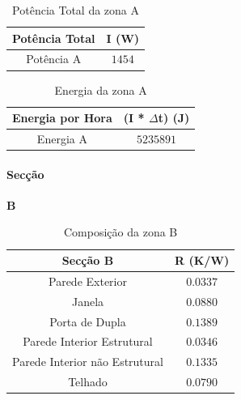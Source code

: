 \documentclass[12pt, a4paper]{article}
\begin{document}
\vspace{35mm}

\begin{table}[htpb]
	\begin{center}
		\begin{tabular}{c c}
			\toprule
			Potência  Total 										 & 	I (W) \\
			\midrule
			 Potência A		               	     & $1454$	 \\
			\bottomrule
		\end{tabular}
	\end{center}
	\caption{Potência Total da zona A}\label{tab:seccaoApotT}
\end{table}

\vspace{35mm}

\begin{table}[htpb]
	\begin{center}
		\begin{tabular}{c c}
			\toprule
			Energia por Hora 								 & 	(I * $\Delta$t) (J) \\
			\midrule
			Energia A 						               	     & $5235891$	 \\
			\bottomrule
		\end{tabular}
	\end{center}
	\caption{Energia da zona A}\label{tab:seccaoAenergia}
\end{table}

\pagebreak
\paragraph{Secção}
\textbf{B}

\begin{table}[htpb]
	\begin{center}
		\begin{tabular}{c c}
			\toprule
			Secção B  													 & 	R (K/W) \\
			\midrule
			Parede Exterior			              				     & $0.0337$		 \\
			Janela                  										 & $0.0880$		 \\
			Porta de Dupla             	  							 & $0.1389$		 \\
			\cline{1-1}
			Parede Interior Estrutural             	   		 & $0.0346$		 \\
			\cline{1-1}
			Parede Interior n\~ao Estrutural          		 & $0.1335$		 \\
			\cline{1-1}
			Telhado                   									 & $0.0790$		 \\
			\bottomrule
		\end{tabular}
	\end{center}
	\caption{Composição da zona B}\label{tab:seccaoB}
\end{table}
\end{document}
